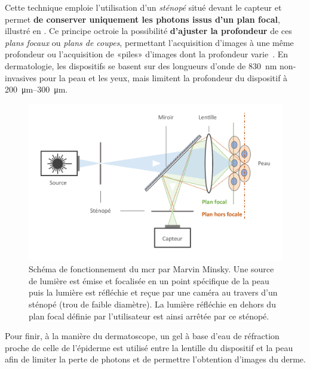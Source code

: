 \addtocounter{footnote}{1}

Cette technique emploie l’utilisation d’un \textit{sténopé} situé devant le capteur et permet \textbf{de conserver uniquement les photons issus d'un plan focal}, illustré en . Ce principe octroie la possibilité \textbf{d'ajuster la profondeur} de ces \textit{plans focaux} ou \textit{plans de coupes}, permettant l'acquisition d'images à une même profondeur ou l'acquisition de «piles» d'images dont la profondeur varie~\cite{Sheppard2015}. En dermatologie, les dispositifs se basent sur des longueurs d’onde de \SI{830}{\nano\metre} non-invasives pour la peau et les yeux, mais limitent la profondeur du dispositif à \SIrange{200}{300}{\micro\metre}.\par

\begin{figure}[H]
\centering
    \includegraphics[width=\linewidth]{contents/chapter_2/resources/scheme_principle_rcm.pdf}
    \caption{Schéma de fonctionnement du \gls{mcr} par Marvin Minsky. Une source de lumière est émise et focalisée en un point spécifique de la peau puis la lumière est réfléchie et reçue par une caméra au travers d'un sténopé (trou de faible diamètre). La lumière réfléchie en dehors du plan focal définie par l'utilisateur est ainsi arrêtée par ce sténopé.}
    \label{fig:scheme_principle_rcm}
\end{figure}\par

Pour finir, à la manière du dermatoscope, un gel à base d’eau de réfraction proche de celle de l’épiderme est utilisé entre la lentille du dispositif et la peau afin de limiter la perte de photons et de permettre l’obtention d’images du derme.\par

